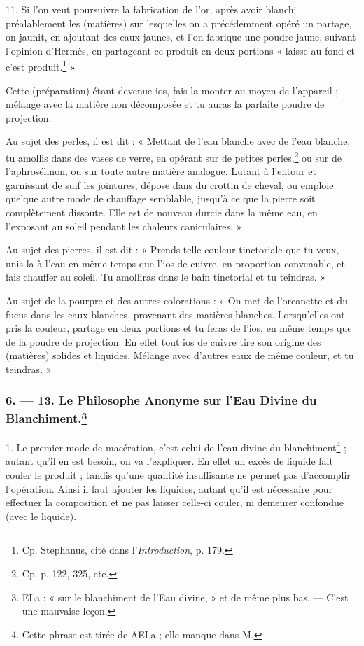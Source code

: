 \documentclass[a4paper, 11pt, oneside, polutonikogreek, french]{article}
\begin{document}
11. Si l'on veut poursuivre la fabrication de l'or, après avoir blanchi préalablement les (matières) sur lesquelles on a précédemment opéré un partage, on jaunit, en ajoutant des eaux jaunes, et l'on fabrique une poudre jaune, suivant l'opinion d'Hermès, en partageant ce produit en deux portions « laisse au fond et c'est produit.\footnote{Cp. Stephanus, cité dans l'\emph{Introduction}, p. 179.} »

Cette (préparation) étant devenue ios, fais-la monter au moyen de l'appareil ; mélange avec la matière non décomposée et tu auras la parfaite poudre de projection.

Au sujet des perles, il est dit : « Mettant de l'eau blanche avec de l'eau blanche, tu amollis dans des vases de verre, en opérant sur de petites perles,\footnote{Cp. p. 122, 325, etc.} ou sur de l'aphrosélinon, ou sur toute autre matière analogue. Lutant à l'entour et garnissant de suif les jointures, dépose dans du crottin de cheval, ou emploie quelque autre mode de chauffage semblable, jusqu'à ce que la pierre soit complètement dissoute. Elle est de nouveau durcie dans la même eau, en l'exposant au soleil pendant les chaleurs caniculaires. »

Au sujet des pierres, il est dit : « Prends telle couleur tinctoriale que tu veux, unis-la à l'eau en même temps que l'ios de cuivre, en proportion convenable, et fais chauffer au soleil. Tu amolliras dans le bain tinctorial et tu teindras. »

Au sujet de la pourpre et des autres colorations : « On met de l'orcanette et du fucus dans les eaux blanches, provenant des matières blanches. Lorsqu'elles ont pris la couleur, partage en deux portions et tu feras de l'ios, en même temps que de la poudre de projection. En effet tout ios de cuivre tire son origine des (matières) solides et liquides. Mélange avec d'autres eaux de même couleur, et tu teindras. »

\bigskip
\centerline{\EightStarTaper}
\centerline{\EightStarTaper\EightStarTaper}
\bigskip

\subsubsection[6. --- 13. Le Philosophe Anonyme sur l'Eau Divine du Blanchiment.]{6. --- 13. Le Philosophe Anonyme sur l'Eau Divine du Blanchiment.\footnote{ELa : « sur le blanchiment de l'Eau divine, » et de même plus bas. --- C'est une mauvaise leçon.}}

1. Le premier mode de macération, c'est celui de l'eau divine du blanchiment\footnote{Cette phrase est tirée de AELa ; elle manque dans M.} ; autant qu'il en est besoin, on va l'expliquer. En effet un excès de liquide fait couler le produit ; tandis qu'une quantité insuffisante ne permet pas d'accomplir l'opération. Ainsi il faut ajouter les liquides, autant qu'il est nécessaire pour effectuer la composition et ne pas laisser celle-ci couler, ni demeurer confondue (avec le liquide).
\end{document}
